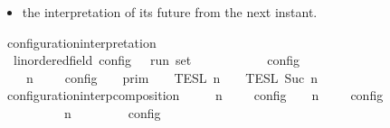 \begin{isabellebody}
\begin{isamarkuptext}
\begin{itemize}
\item the interpretation of its future from the next instant.%
\end{itemize}%
\end{isamarkuptext}\isamarkuptrue%
\isamarkupfalse%
\ configuration{\isacharunderscore}interpretation\isanewline
\ \ {\isacharcolon}{\isacharcolon}{\isacartoucheopen}{\isacharprime}{\isasymtau}{\isacharcolon}{\isacharcolon}linordered{\isacharunderscore}field\ config\ {\isasymRightarrow}\ {\isacharprime}{\isasymtau}\ run\ set{\isacartoucheclose}\ \ \ \ \ \ \ \ \ \ {\isacharparenleft}{\isacartoucheopen}{\isasymlbrakk}\ {\isacharunderscore}\ {\isasymrbrakk}\isactrlsub c\isactrlsub o\isactrlsub n\isactrlsub f\isactrlsub i\isactrlsub g{\isacartoucheclose}\ {}{}{\isacharparenright}\isanewline
{}\isanewline
\ \ {\isacartoucheopen}{\isasymlbrakk}\ {\isasymGamma}{\isacharcomma}\ n\ {\isasymTurnstile}\ {\isasymPsi}\ {\isasymtriangleright}\ {\isasymPhi}\ {\isasymrbrakk}\isactrlsub c\isactrlsub o\isactrlsub n\isactrlsub f\isactrlsub i\isactrlsub g\ {\isacharequal}\ {\isasymlbrakk}{\isasymlbrakk}\ {\isasymGamma}\ {\isasymrbrakk}{\isasymrbrakk}\isactrlsub p\isactrlsub r\isactrlsub i\isactrlsub m\ {\isasyminter}\ {\isasymlbrakk}{\isasymlbrakk}\ {\isasymPsi}\ {\isasymrbrakk}{\isasymrbrakk}\isactrlsub T\isactrlsub E\isactrlsub S\isactrlsub L\isactrlbsup {\isasymge}\ n\isactrlesup \ {\isasyminter}\ {\isasymlbrakk}{\isasymlbrakk}\ {\isasymPhi}\ {\isasymrbrakk}{\isasymrbrakk}\isactrlsub T\isactrlsub E\isactrlsub S\isactrlsub L\isactrlbsup {\isasymge}\ Suc\ n\isactrlesup {\isacartoucheclose}\isanewline
\isanewline
{}\isamarkupfalse%
\ configuration{\isacharunderscore}interp{\isacharunderscore}composition{\isacharcolon}\isanewline
\ \ \ {\isacartoucheopen}{\isasymlbrakk}\ {\isasymGamma}\ n\ {\isasymTurnstile}\ {\isasymPsi}\ {\isasymtriangleright}\ {\isasymPhi}\ {\isasymrbrakk}\isactrlsub c\isactrlsub o\isactrlsub n\isactrlsub f\isactrlsub i\isactrlsub g\ {\isasyminter}\ {\isasymlbrakk}\ {\isasymGamma}\ n\ {\isasymTurnstile}\ {\isasymPsi}\ {\isasymtriangleright}\ {\isasymPhi}\ {\isasymrbrakk}\isactrlsub c\isactrlsub o\isactrlsub n\isactrlsub f\isactrlsub i\isactrlsub g\isanewline
\ \ \ \ \ {\isacharequal}\ {\isasymlbrakk}\ {\isacharparenleft}{\isasymGamma}\ {\isacharat}\ {\isasymGamma}\ n\ {\isasymTurnstile}\ {\isacharparenleft}{\isasymPsi}\ {\isacharat}\ {\isasymPsi}\ {\isasymtriangleright}\ {\isacharparenleft}{\isasymPhi}\ {\isacharat}\ {\isasymPhi}\ {\isasymrbrakk}\isactrlsub c\isactrlsub o\isactrlsub n\isactrlsub f\isactrlsub i\isactrlsub g{\isacartoucheclose}\isanewline

\end{isabellebody}
